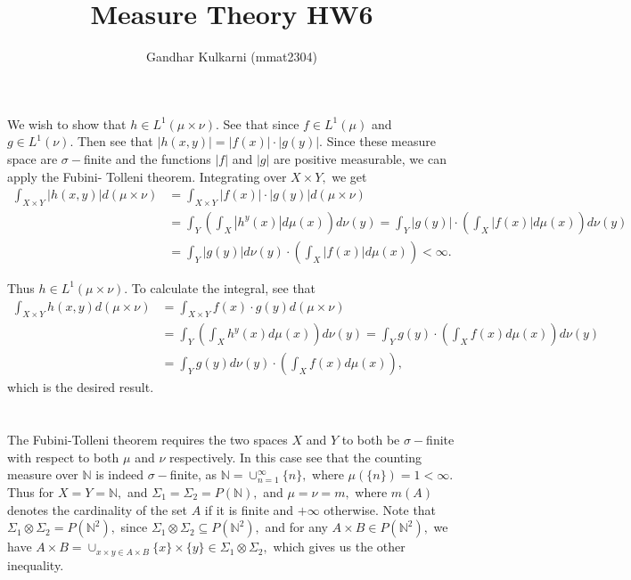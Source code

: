 \documentclass{article}
\title{Measure Theory HW6} %
\author{Gandhar Kulkarni (mmat2304)} %
\date{} %
\begin{document}
\maketitle %

\section{} %
We wish to show that $h \in L^1(\mu \times \nu).$ See that since $f \in L^1(\mu)$ and $g \in L^1(\nu).$ Then see that $|h(x,y)|=|f(x)|\cdot |g(y)|.$ Since these measure space are $\sigma-$finite and the functions $|f|$ and $|g|$ are positive measurable, we can apply the Fubini- Tolleni theorem. Integrating over $X \times Y,$ we get 
\begin{align*}
\int_{X \times Y} |h(x,y)| d(\mu \times \nu) &= \int_{X \times Y}|f(x)|\cdot |g(y)| d(\mu \times \nu)\\
&= \int_Y \left( \int_X |h^{y}(x)| d\mu(x) \right) d\nu(y)= \int_Y |g(y)| \cdot \left( \int_X |f(x)| d\mu(x) \right) d\nu(y)\\
&= \int_Y |g(y)| d\nu(y) \cdot \left( \int_X |f(x)| d\mu(x) \right) < \infty.
\end{align*}

Thus $h \in L^1(\mu \times \nu).$ To calculate the integral, see that 
\begin{align*}
	\int_{X \times Y} h(x,y) d(\mu \times \nu) &= \int_{X \times Y}f(x)\cdot g(y) d(\mu \times \nu)\\
	&= \int_Y \left( \int_X h^{y}(x) d\mu(x) \right) d\nu(y)= \int_Y g(y) \cdot \left( \int_X f(x) d\mu(x) \right) d\nu(y)\\
	&= \int_Y g(y) d\nu(y) \cdot \left( \int_X f(x) d\mu(x) \right),
\end{align*}
which is the desired result.


\section{} %
The Fubini-Tolleni theorem requires the two spaces $X$ and $Y$ to both be $\sigma-$finite with respect to both $\mu$ and $\nu$ respectively. In this case see that the counting measure over $\mathbb{N}$ is indeed $\sigma-$finite, as $\mathbb{N}=\cup_{n=1}^{\infty} \{n\},$ where $\mu(\{n\})=1 < \infty.$ Thus for $X=Y=\mathbb{N},$ and $\Sigma_1=\Sigma_2=P(\mathbb{N}),$ and $\mu=\nu =m,$ where $m(A)$ denotes the cardinality of the set $A$ if it is finite and $+\infty$ otherwise. Note that $\Sigma_1 \otimes \Sigma_2= P(\mathbb{N}^2),$ since $\Sigma_1 \otimes \Sigma_2 \subseteq P(\mathbb{N}^2),$ and for any $ A \times B \in P(\mathbb{N}^2),$ we have $A \times B= \cup_{x\times y \in A \times B} \{x\} \times \{y\} \in \Sigma_1 \otimes \Sigma_2,$ which gives us the other inequality. 
\end{document}
